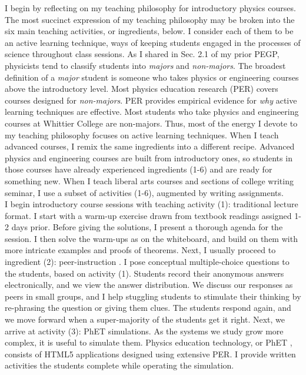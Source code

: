 \documentclass[../../../main.tex]{subfiles}
\begin{document}
I begin by reflecting on my teaching philosophy for introductory physics courses.  The most succinct expression of my teaching philosophy may be broken into the six main teaching activities, or ingredients, below.  I consider each of them to be an active learning technique, ways of keeping students engaged in the processes of science throughout class sessions.  As I shared in Sec. 2.1 of my prior PEGP, physicists tend to classify students into \textit{majors} and \textit{non-majors}.  The broadest definition of a \textit{major} student is someone who takes physics or engineering courses above the introductory level.  Most physics education research (PER) covers courses designed for \textit{non-majors}.  PER provides empirical evidence for \textit{why} active learning techniques are effective.  Most students who take physics and engineering courses at Whittier College are non-majors.  Thus, most of the energy I devote to my teaching philosophy focuses on active learning techniques.  When I teach advanced courses, I remix the same ingredients into a different recipe.  Advanced physics and engineering courses are built from introductory ones, so students in those courses have already experienced ingredients (1-6) and are ready for something new.  When I teach liberal arts courses and sections of college writing seminar, I use a subset of activities (1-6), augmented by writing assignments.
\\
\vspace{0.25cm}
I begin introductory course sessions with teaching activity (1): traditional lecture format.  I start with a warm-up exercise drawn from textbook readings assigned 1-2 days prior.  Before giving the solutions, I present a thorough agenda for the session.  I then solve the warm-ups as on the whiteboard, and build on them with more intricate examples and proofs of theorems.  Next, I usually proceed to ingredient (2): peer-instruction \cite{mazur2013peer}.  I pose conceptual multiple-choice questions to the students, based on activity (1).  Students record their anonymous answers electronically, and we view the answer distribution.  We discuss our responses as peers in small groups, and I help stuggling students to stimulate their thinking by re-phrasing the question or giving them clues.  The students respond again, and we move forward when a super-majority of the students get it right.  Next, we arrive at activity (3): PhET simulations.  As the systems we study grow more complex, it is useful to simulate them.  Physics education technology, or PhET \cite{phet}, consists of HTML5 applications designed using extensive PER.  I provide written activities the students complete while operating the simulation.
\end{document}
